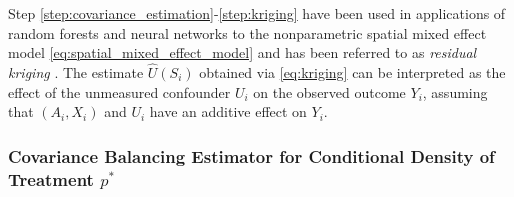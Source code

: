 \documentclass[12pt]{article}
\makeatletter
\newcounter{stepcounter}
\newenvironment{step}[1][] %
  {%
   \par\addvspace{\medskipamount}%
   \refstepcounter{stepcounter}%
   \noindent %
   \textit{%
     Step \thestepcounter%
     \def\@optarg{#1}%
     \ifx\@optarg\@empty %
     \else
        \space(#1)%
     \fi %
     .%
   }%
   \quad %
  }%
  {%
   \par\addvspace{\medskipamount}%
  }
\makeatother
\begin{document}
Step \ref{step:covariance_estimation}-\ref{step:kriging} have been used in applications of random forests and neural networks to the nonparametric spatial mixed effect model \eqref{eq:spatial_mixed_effect_model} and has been referred to as \textit{residual kriging} \citep{saha2023random, zhan2024neural}. The estimate $\widehat U(S_i)$ obtained via \eqref{eq:kriging} can be interpreted as the effect of the unmeasured confounder $U_i$ on the observed outcome $Y_i$, assuming that $(A_i,X_i)$ and $U_i$ have an additive effect on $Y_i$. %


\subsubsection{Covariance Balancing Estimator for Conditional Density of Treatment $p^*$}

\end{document}
